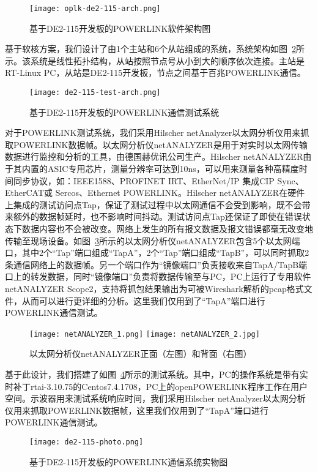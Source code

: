 \begin{figure}[!htb]
  \centering
  \texttt{[image: oplk-de2-115-arch.png]}
  \caption{基于DE2-115开发板的POWERLINK软件架构图}
  \label{fig:oplk-de2-115-arch}
\end{figure}

基于软核方案，我们设计了由1个主站和6个从站组成的系统，系统架构如图~\ref{fig:de2-115-test-arch}所示。该系统是线性拓扑结构，从站按照节点号从小到大的顺序依次连接。主站是RT-Linux PC，从站是DE2-115开发板，节点之间基于百兆POWERLINK通信\cite{xksun-2018}。

\begin{figure}[!htb]
  \centering
  \texttt{[image: de2-115-test-arch.png]}
  \caption{基于DE2-115开发板的POWERLINK通信测试系统}
  \label{fig:de2-115-test-arch}
\end{figure}

对于POWERLINK测试系统，我们采用Hilscher netAnalyzer以太网分析仪用来抓取POWERLINK数据帧。以太网分析仪netANALYZER是用于对实时以太网传输数据进行监控和分析的工具，由德国赫优讯公司生产。Hilscher netANALYZER由于其内置的ASIC专用芯片，测量分辨率可达到10ns，可以用来测量各种高精度时间同步协议，如：IEEE1588、PROFINET IRT、EtherNet/IP 集成CIP Sync、EtherCAT或 Sercos、Ethernet POWERLINK。Hilscher netANALYZER在硬件上集成的测试访问点Tap，保证了测试过程中以太网通信不会受到影响，既不会带来额外的数据帧延时，也不影响时间抖动。测试访问点Tap还保证了即使在错误状态下数据内容也不会被改变。网络上发生的所有报文数据及报文错误都毫无改变地传输至现场设备。如图~\ref{fig:netANALYZER-photo}所示的以太网分析仪netANALYZER包含5个以太网端口，其中2个“Tap”端口组成“TapA”，2个“Tap”端口组成“TapB”，可以同时抓取2条通信网络上的数据帧。另一个端口作为“镜像端口”负责接收来自TapA/TapB端口上的转发数据，同时“镜像端口”负责将数据传输至与PC，PC上运行了专用软件netANALYZER Scope2，支持将抓包结果输出为可被Wireshark解析的pcap格式文件，从而可以进行更详细的分析。这里我们仅用到了“TapA”端口进行POWERLINK通信测试。

\begin{figure}[htb]\centering
  \texttt{[image: netANALYZER\_1.png]}  
  \texttt{[image: netANALYZER\_2.jpg]}
  \caption{以太网分析仪netANALYZER正面（左图）和背面（右图）}
  \label{fig:netANALYZER-photo}
\end{figure}


基于此设计，我们搭建了如图~\ref{fig:de2-115-photo}所示的测试系统。其中，PC的操作系统是带有实时补丁rtai-3.10.75的Centos7.4.1708，PC上的openPOWERLINK程序工作在用户空间。示波器用来测试系统响应时间，我们采用Hilscher netAnalyzer以太网分析仪用来抓取POWERLINK数据帧，这里我们仅用到了“TapA”端口进行POWERLINK通信测试。
\begin{figure}[!htb]
  \centering
  \texttt{[image: de2-115-photo.png]}
  \caption{基于DE2-115开发板的POWERLINK通信系统实物图}
  \label{fig:de2-115-photo}
\end{figure}

